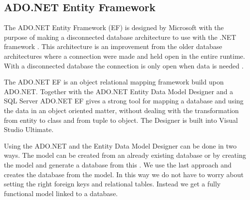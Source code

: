 \subsection{ADO.NET Entity Framework}
\label{sub:adonet}
The ADO.NET Entity Framework (EF) is designed by Microsoft with the purpose of making a disconnected database architecture to use with the .NET framework \cite{adonetDesignGoal}. 
This architecture is an improvement from the older database architectures where a connection were made and held open in the entire runtime. With a disconnected database the connection is only open when data is needed \cite{disconnectedData}. 

The ADO.NET EF is an object relational mapping framework \cite{adonetEntityFramework} build upon ADO.NET. 
Together with the ADO.NET Entity Data Model Designer and a SQL Server ADO.NET EF gives a strong tool for mapping a database and using the data in an object oriented matter, without dealing with the transformation from entity to class and from tuple to object. 
The Designer is built into Visual Studio Ultimate. 

Using the ADO.NET and the Entity Data Model Designer can be done in two ways. 
The model can be created from an already existing database or by creating the model and generate a database from this \cite{adonetEntityDataModelDesigner}.
We use the last approach and creates the database from the model. 
In this way we do not have to worry about setting the right foreign keys and relational tables. Instead we get a fully functional model linked to a database. 


